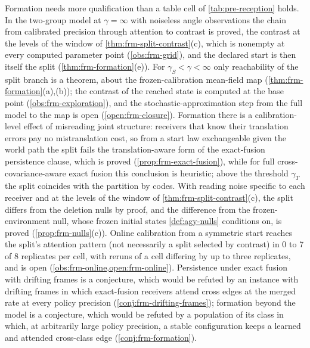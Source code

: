 Formation needs more qualification than a table cell of \cref{tab:pre-reception} holds. In the two-group model at $\gamma=\infty$ with noiseless angle observations the chain from calibrated precision through attention to contrast is proved, the contrast at the levels of the window of \cref{thm:frm-split-contrast}(c), which is nonempty at every computed parameter point (\cref{obs:frm-grid}), and the declared start is then itself the split (\cref{thm:frm-formation}(e)). For $\gamma_S<\gamma<\infty$ only reachability of the split branch is a theorem, about the frozen-calibration mean-field map (\cref{thm:frm-formation}(a),(b)); the contrast of the reached state is computed at the base point (\cref{obs:frm-exploration}), and the stochastic-approximation step from the full model to the map is open (\cref{open:frm-closure}). Formation there is a calibration-level effect of misreading joint structure: receivers that know their translation errors pay no mistranslation cost, so from a start law exchangeable given the world path the split fails the translation-aware form of the exact-fusion persistence clause, which is proved (\cref{prop:frm-exact-fusion}), while for full cross-covariance-aware exact fusion this conclusion is heuristic; above the threshold $\gamma_T$ the split coincides with the partition by codes. With reading noise specific to each receiver and at the levels of the window of \cref{thm:frm-split-contrast}(c), the split differs from the deletion nulls by proof, and the difference from the frozen-environment null, whose frozen initial states \cref{def:agy-nulls} conditions on, is proved (\cref{prop:frm-nulls}(c)). Online calibration from a symmetric start reaches the split's attention pattern (not necessarily a split selected by contrast) in 0 to 7 of 8 replicates per cell, with reruns of a cell differing by up to three replicates, and is open (\cref{obs:frm-online,open:frm-online}). Persistence under exact fusion with drifting frames is a conjecture, which would be refuted by an instance with drifting frames in which exact-fusion receivers attend cross edges at the merged rate at every policy precision (\cref{conj:frm-drifting-frames}); formation beyond the model is a conjecture, which would be refuted by a population of its class in which, at arbitrarily large policy precision, a stable configuration keeps a learned and attended cross-class edge (\cref{conj:frm-formation}).
